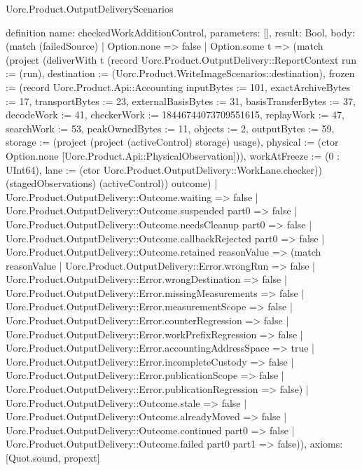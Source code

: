 \begin{lexlean}{Uorc.Product.OutputDeliveryScenarios}
\begin{semanticmodule}
definition{
  name: checkedWorkAdditionControl,
  parameters: [],
  result: Bool,
  body: (match (failedSource)
    | Option.none => false
    | Option.some t => (match (project (deliverWith t (record Uorc.Product.OutputDelivery::ReportContext {run := (run), destination := (Uorc.Product.WriteImageScenarios::destination), frozen := (record Uorc.Product.Api::Accounting {inputBytes := 101, exactArchiveBytes := 17, transportBytes := 23, externalBasisBytes := 31, basisTransferBytes := 37, decodeWork := 41, checkerWork := 18446744073709551615, replayWork := 47, searchWork := 53, peakOwnedBytes := 11, objects := 2, outputBytes := 59, storage := (project (project (activeControl) storage) usage), physical := (ctor Option.none [Uorc.Product.Api::PhysicalObservation])}), workAtFreeze := (0 : UInt64), lane := (ctor Uorc.Product.OutputDelivery::WorkLane.checker)}) (stagedObservations) (activeControl)) outcome)
      | Uorc.Product.OutputDelivery::Outcome.waiting => false
      | Uorc.Product.OutputDelivery::Outcome.suspended part0 => false
      | Uorc.Product.OutputDelivery::Outcome.needsCleanup part0 => false
      | Uorc.Product.OutputDelivery::Outcome.callbackRejected part0 => false
      | Uorc.Product.OutputDelivery::Outcome.retained reasonValue => (match reasonValue
        | Uorc.Product.OutputDelivery::Error.wrongRun => false
        | Uorc.Product.OutputDelivery::Error.wrongDestination => false
        | Uorc.Product.OutputDelivery::Error.missingMeasurements => false
        | Uorc.Product.OutputDelivery::Error.measurementScope => false
        | Uorc.Product.OutputDelivery::Error.counterRegression => false
        | Uorc.Product.OutputDelivery::Error.workPrefixRegression => false
        | Uorc.Product.OutputDelivery::Error.accountingAddressSpace => true
        | Uorc.Product.OutputDelivery::Error.incompleteCustody => false
        | Uorc.Product.OutputDelivery::Error.publicationScope => false
        | Uorc.Product.OutputDelivery::Error.publicationRegression => false)
      | Uorc.Product.OutputDelivery::Outcome.stale => false
      | Uorc.Product.OutputDelivery::Outcome.alreadyMoved => false
      | Uorc.Product.OutputDelivery::Outcome.continued part0 => false
      | Uorc.Product.OutputDelivery::Outcome.failed part0 part1 => false)),
  axioms: [Quot.sound, propext]
}


\end{semanticmodule}
\end{lexlean}
